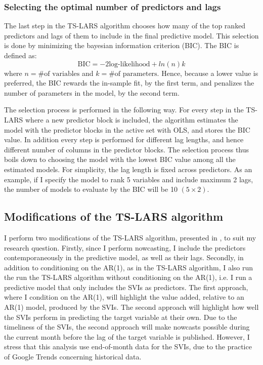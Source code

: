 \subsubsection{Selecting the optimal number of predictors and lags}\label{selection}
The last step in the TS-LARS algorithm chooses how many of the top ranked predictors and lags of them to include in the final predictive model. This selection is done by minimizing the bayesian information criterion (BIC). The BIC is defined as:
\begin{equation}\label{bic}
\text{BIC} = -2 \text{log-likelihood} + ln(n) k
\end{equation}
\noindent where $n = \text{\# of variables}$ and $k = \text{\# of parameters}$. Hence, because a lower value is preferred, the BIC rewards the in-sample fit, by the first term, and penalizes the number of parameters in the model, by the second term.

The selection process is performed in the following way. For every step in the TS-LARS where a new predictor block is included, the algorithm estimates the model with the predictor blocks in the active set with OLS, and stores the BIC value. In addition every step is performed for different lag lengths, and hence different number of columns in the predictor blocks. The selection process thus boils down to choosing the model with the lowest BIC value among all the estimated models. For simplicity, the lag length is fixed across predictors. As an example, if I specify the model to rank 5 variables and include maximum 2 lags, the number of models to evaluate by the BIC will be 10 $(5 \times 2)$.



\subsection{Modifications of the TS-LARS algorithm}\label{modifications}

I perform two modifications of the TS-LARS algorithm, presented in \textcite{gelper2008}, to suit my research question. Firstly, since I perform nowcasting, I include the predictors contemporaneously in the predictive model, as well as their lags. Secondly, in addition to conditioning on the AR(1), as in the TS-LARS algorithm, I also run the run the TS-LARS algorithm without conditioning on the AR(1), i.e. I run a predictive model that only includes the SVIs as predictors. The first approach, where I condition on the AR(1), will highlight the value added, relative to an AR(1) model, produced by the SVIs. The second approach will highlight how well the SVIs perform in predicting the target variable at their own. Due to the timeliness of the SVIs, the second approach will make nowcasts possible during the current month before the lag of the target variable is published. However, I stress that this analysis use end-of-month data for the SVIs, due to the practice of Google Trends concerning historical data.

